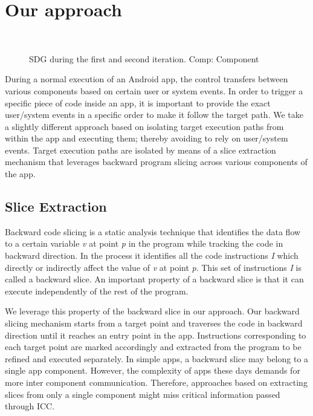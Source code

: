 \section{Our approach}
\label{sec:our_approach}

\begin{figure*}[ht!]
\centering
{}%
~%
%
\caption{SDG during the first and second iteration. Comp: Component}
\label{fig:sdg}

\end{figure*}

During a normal execution of an Android app, the control transfers between various components based on certain user or system events. In order to trigger a specific piece of code inside an app, it is important to provide the exact user/system events in a specific order to make it follow the target path. We take a slightly different approach based on isolating target execution paths from within the app and executing them; thereby avoiding to rely on user/system events. Target execution paths are isolated by means of a slice extraction mechanism that leverages backward program slicing across various components of the app.  

\subsection{Slice Extraction}

Backward code slicing is a static analysis technique that identifies the data flow to a certain variable \textit{v} at point \textit{p} in the program while tracking the code in backward direction. In the process it identifies all the code instructions \textit{I} which directly or indirectly affect the value of \textit{v} at point \textit{p}. This set of instructions \textit{I} is called a backward slice. An important property of a backward slice is that it can execute independently of the rest of the program. 

We leverage this property of the backward slice in our approach. Our backward slicing mechanism starts from a target point and traverses the code in backward direction until it reaches an entry point in the app. Instructions corresponding to each target point are marked accordingly and extracted from the program to be refined and executed separately. In simple apps, a backward slice may belong to a single app component. However, the complexity of apps these days demands for more inter component communication. Therefore, approaches based on extracting slices from only a single component might miss critical information passed through ICC.  

